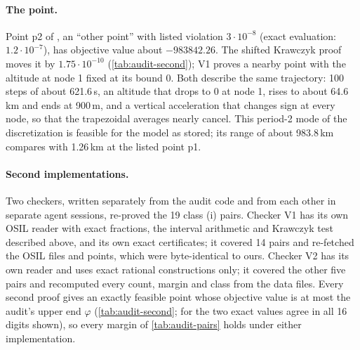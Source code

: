 \paragraph{The  point.}
Point p2 of , an ``other point'' with listed violation $3\cdot10^{-8}$ (exact evaluation: $1.2\cdot10^{-7}$), has objective value about $-983842.26$.
The shifted Krawczyk proof moves it by $1.75\cdot10^{-10}$ (\cref{tab:audit-second}); V1 proves a nearby point with the altitude at node 1 fixed at its bound 0.
Both describe the same trajectory: 100 steps of about 621.6\,s, an altitude that drops to 0 at node 1, rises to about 64.6\,km and ends at 900\,m, and a vertical acceleration that changes sign at every node, so that the trapezoidal averages nearly cancel.
This period-2 mode of the discretization is feasible for the model as stored; its range of about 983.8\,km compares with 1.26\,km at the listed point p1.

\paragraph{Second implementations.}
Two checkers, written separately from the audit code and from each other in separate agent sessions, re-proved the 19 class (i) pairs.
Checker V1 has its own OSIL reader with exact fractions, the interval arithmetic and Krawczyk test described above, and its own exact certificates; it covered 14 pairs and re-fetched the OSIL files and points, which were byte-identical to ours.
Checker V2 has its own reader and uses exact rational constructions only; it covered the other five pairs and recomputed every count, margin and class from the data files.
Every second proof gives an exactly feasible point whose objective value is at most the audit's upper end $\varphi$ (\cref{tab:audit-second}; for  the two exact values agree in all 16 digits shown), so every margin of \cref{tab:audit-pairs} holds under either implementation.

